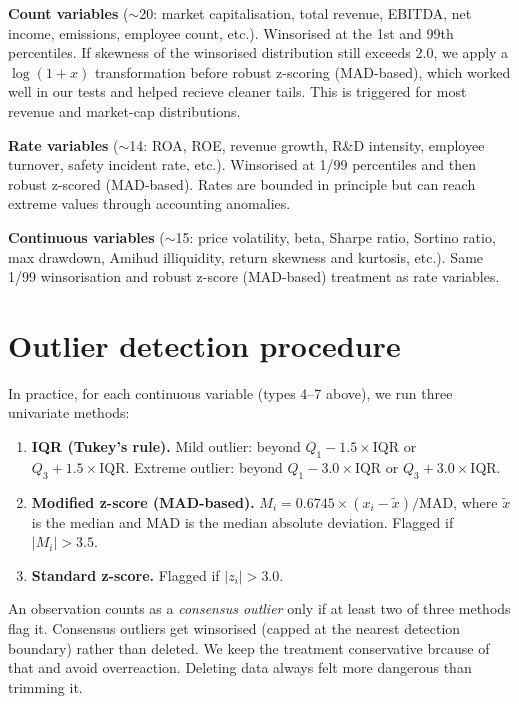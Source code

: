 \textbf{Count variables} ($\sim$20: market capitalisation, total revenue, EBITDA, net income, emissions, employee count, etc.). Winsorised at the 1st and 99th percentiles. If skewness of the winsorised distribution still exceeds 2.0, we apply a $\log(1+x)$ transformation before robust z-scoring (MAD-based), which worked well in our tests and helped recieve cleaner tails. This is triggered for most revenue and market-cap distributions.

\textbf{Rate variables} ($\sim$14: ROA, ROE, revenue growth, R\&D intensity, employee turnover, safety incident rate, etc.). Winsorised at 1/99 percentiles and then robust z-scored (MAD-based). Rates are bounded in principle but can reach extreme values through accounting anomalies.

\textbf{Continuous variables} ($\sim$15: price volatility, beta, Sharpe ratio, Sortino ratio, max drawdown, Amihud illiquidity, return skewness and kurtosis, etc.). Same 1/99 winsorisation and robust z-score (MAD-based) treatment as rate variables.

\section{Outlier detection procedure}
\label{sec:outlier_detect}

In practice, for each continuous variable (types 4--7 above), we run three univariate methods:

\begin{enumerate}
    \item \textbf{IQR (Tukey's rule).} Mild outlier: beyond $Q_1 - 1.5 \times \mathrm{IQR}$ or $Q_3 + 1.5 \times \mathrm{IQR}$. Extreme outlier: beyond $Q_1 - 3.0 \times \mathrm{IQR}$ or $Q_3 + 3.0 \times \mathrm{IQR}$.

    \item \textbf{Modified z-score (MAD-based).} $M_i = 0.6745 \times (x_i - \tilde{x}) / \mathrm{MAD}$, where $\tilde{x}$ is the median and MAD is the median absolute deviation. Flagged if $|M_i| > 3.5$.

    \item \textbf{Standard z-score.} Flagged if $|z_i| > 3.0$.
\end{enumerate}

An observation counts as a \textit{consensus outlier} only if at least two of three methods flag it. Consensus outliers get winsorised (capped at the nearest detection boundary) rather than deleted. We keep the treatment conservative brcause of that and avoid overreaction. Deleting data always felt more dangerous than trimming it.

